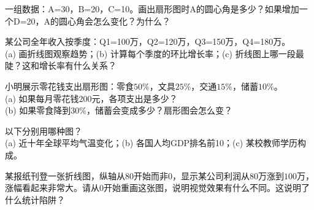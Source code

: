 \begin{exercise}
\item 一组数据：A=30，B=20，C=10。画出扇形图时A的圆心角是多少？如果增加一个D=20，A的圆心角会怎么变化？为什么？
\item 某公司全年收入按季度：Q1=100万，Q2=120万，Q3=150万，Q4=180万。\\
(a) 画折线图观察趋势；(b) 计算每个季度的环比增长率；(c) 折线图上哪一段最陡？这和增长率有什么关系？
\item 小明展示零花钱支出扇形图：零食$50\%$，文具$25\%$，交通$15\%$，储蓄$10\%$。\\
(a) 如果每月零花钱$200$元，各项支出是多少？\\
(b) 如果零食降到$30\%$，储蓄会变成多少？扇形图会怎么变？
\item 以下分别用哪种图？\\
(a) 近十年全球平均气温变化；(b) 各国人均GDP排名前10；(c) 某校教师学历构成。
\item 某报纸刊登一张折线图，纵轴从$80$开始而非$0$，显示某公司利润从$80$万涨到$100$万，涨幅看起来非常大。请从$0$开始重画这张图，说明视觉效果有什么不同。这说明了什么统计陷阱？
\end{exercise}

\newpage
